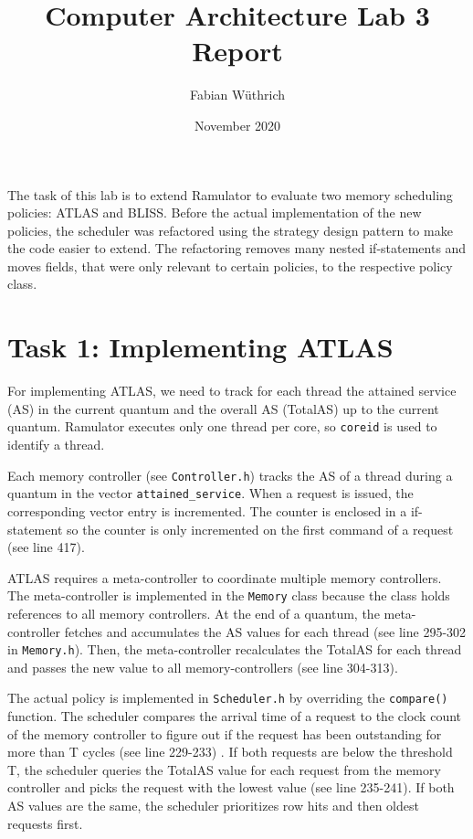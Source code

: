 \documentclass[a4paper]{article}
\begin{document}
\title{Computer Architecture Lab 3 Report}
\author{Fabian Wüthrich}
\date{November 2020}
\maketitle

\noindent
The task of this lab is to extend Ramulator to evaluate two memory scheduling
policies: ATLAS and BLISS. Before the actual implementation of the new
policies, the scheduler was refactored using the strategy design pattern to
make the code easier to extend. The refactoring removes many nested
if-statements and moves fields, that were only relevant to certain policies, to
the respective policy class.

\section*{Task 1: Implementing ATLAS}

For implementing ATLAS, we need to track for each thread the attained service
(AS) in the current quantum and the overall AS (TotalAS) up to the current quantum.
Ramulator executes only one thread per core, so \verb|coreid| is used
to identify a thread.

Each memory controller (see \verb|Controller.h|) tracks the AS of
a thread during a quantum in the vector \verb|attained_service|. When a request
is issued, the corresponding vector entry is incremented. The counter is
enclosed in a if-statement so the counter is only incremented on the first
command of a request (see line 417).

ATLAS requires a meta-controller to coordinate multiple memory controllers. The
meta-controller is implemented in the \verb|Memory| class because the class
holds references to all memory controllers. At the end of a quantum, the
meta-controller fetches and accumulates the AS values for each thread (see
line 295-302 in \verb|Memory.h|). Then, the meta-controller recalculates the
TotalAS for each thread and passes the new value to all memory-controllers
(see line 304-313).

The actual policy is implemented in \verb|Scheduler.h| by overriding the
\verb|compare()| function. The scheduler compares the arrival time of a request
to the clock count of the memory controller to figure out if the request has
been outstanding for more than T cycles (see line 229-233) . If both requests
are below the threshold T, the scheduler queries the TotalAS value for each
request from the memory controller and picks the request with the lowest value
(see line 235-241).  If both AS values are the same, the scheduler prioritizes
row hits and then oldest requests first.
\end{document}
